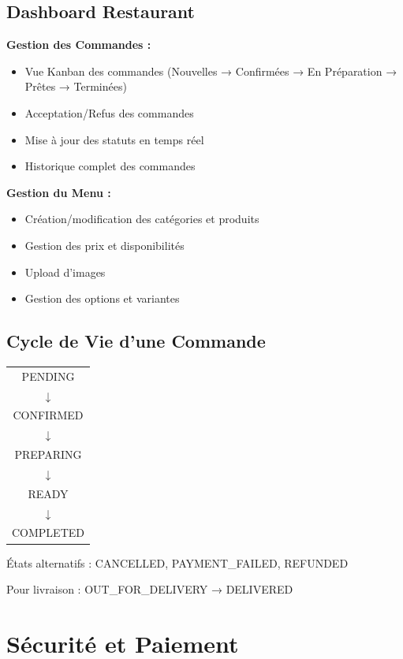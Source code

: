 \documentclass[11pt,a4paper]{article}
\begin{document}
\subsection{Dashboard Restaurant}

\textbf{Gestion des Commandes :}
\begin{itemize}
    \item Vue Kanban des commandes (Nouvelles → Confirmées → En Préparation → Prêtes → Terminées)
    \item Acceptation/Refus des commandes
    \item Mise à jour des statuts en temps réel
    \item Historique complet des commandes
\end{itemize}

\textbf{Gestion du Menu :}
\begin{itemize}
    \item Création/modification des catégories et produits
    \item Gestion des prix et disponibilités
    \item Upload d'images
    \item Gestion des options et variantes
\end{itemize}

\subsection{Cycle de Vie d'une Commande}

\begin{center}
\begin{tabular}{c}
PENDING \\
$\downarrow$ \\
CONFIRMED \\
$\downarrow$ \\
PREPARING \\
$\downarrow$ \\
READY \\
$\downarrow$ \\
COMPLETED
\end{tabular}
\end{center}

États alternatifs : CANCELLED, PAYMENT\_FAILED, REFUNDED

Pour livraison : OUT\_FOR\_DELIVERY → DELIVERED

\section{Sécurité et Paiement}
\end{document}
